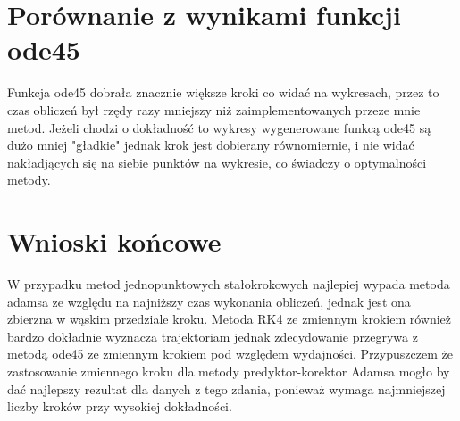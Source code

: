 \documentclass[a4paper, 11pt]{article}
\begin{document}
\section{Porównanie z wynikami funkcji ode45}
Funkcja ode45 dobrała znacznie większe kroki co widać na wykresach, przez to czas obliczeń był rzędy razy mniejszy niż zaimplementowanych przeze mnie metod. Jeżeli chodzi o dokładność to wykresy wygenerowane funkcą ode45 są dużo mniej "gładkie" jednak krok jest dobierany równomiernie, i nie widać nakładjących się na siebie punktów na wykresie, co świadczy o optymalności metody. 
%

\section{Wnioski końcowe}
W przypadku metod jednopunktowych stałokrokowych najlepiej wypada metoda adamsa ze względu na najniższy czas wykonania obliczeń, jednak jest ona zbierzna w wąskim przedziale kroku. Metoda RK4 ze zmiennym krokiem również bardzo dokładnie wyznacza trajektoriam jednak zdecydowanie przegrywa z metodą ode45 ze zmiennym krokiem pod względem wydajności. Przypuszczem że zastosowanie zmiennego kroku dla metody predyktor-korektor Adamsa mogło by dać najlepszy rezultat dla danych z tego zdania, ponieważ wymaga najmniejszej liczby kroków przy wysokiej dokładności. 
\end{document}

